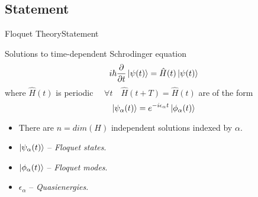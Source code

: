 \documentclass{beamer}
\begin{document}
\subsection{Statement}
\begin{frame}{Floquet Theory}{Statement}
 \begin{theorem}\footnotesize
 Solutions to time-dependent Schrodinger equation 
 \begin{equation*}
  i\hbar\frac{\partial}{\partial t}\ket{\psi(t)} = \hat{H}(t)\ket{\psi(t)}
 \end{equation*} where $\hat{H}(t)$ is periodic $\quad \forall t \quad \hat{H}(t+T) = \hat{H}(t)$
 are of the form
 \begin{equation*}
  \ket{\psi_{\alpha}(t)} = e^{-i\epsilon_{\alpha}t} \ket{\phi_{\alpha}(t)}
 \end{equation*}
 \end{theorem}
 \begin{itemize}  
  \item There are $n = dim(H)$ independent solutions indexed by $\alpha$.
  \item $\ket{\psi_{\alpha}(t)}$ -- \emph{Floquet states}.
  \item $\ket{\phi_{\alpha}(t)}$ -- \emph{Floquet modes}.
  \item $\epsilon_{\alpha}$ -- \emph{Quasienergies}.
 \end{itemize}\normalsize
\end{frame}
\end{document}
